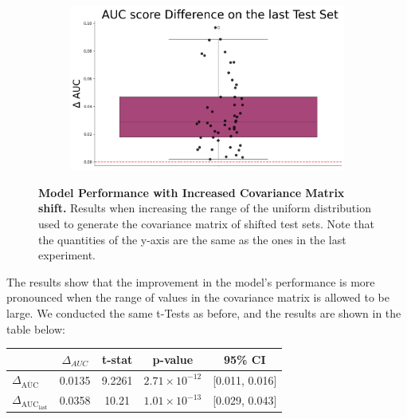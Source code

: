 \begin{figure}[H]
\begin{subfigure}{0.45\textwidth}
    \end{subfigure}
    \begin{subfigure}{0.45\textwidth}
        \centering
        \includegraphics[width=\linewidth]{assets/4_075.png}
        
    \end{subfigure}
    \caption{\textbf{Model Performance with Increased Covariance Matrix shift.} Results when increasing the range of the uniform distribution used to generate the covariance matrix of shifted test sets. Note that the quantities of the y-axis are the same as the ones in the last experiment.}
\end{figure}


The results show that the improvement in the model's performance is more pronounced when the range of values in the covariance matrix is allowed to be large.
We conducted the same t-Tests as before, and the results are shown in the table below:

\begin{table}[H]
    \centering
    \small
    \begin{tabular}{lcccc}
        \toprule
        & $\Delta_{AUC}$ & t-stat & p-value & 95\% CI \\
        \midrule
        $\Delta_{\overline{\text{AUC}}}$ & 0.0135 & 9.2261  & $2.71 \times 10^{-12}$ & [0.011, 0.016] \\
        $\Delta_{\text{AUC}_{\text{last}}}$ & 0.0358 & 10.21 & $1.01 \times 10^{-13}$ & [0.029, 0.043] \\
        \bottomrule
    \end{tabular}
\end{table}








